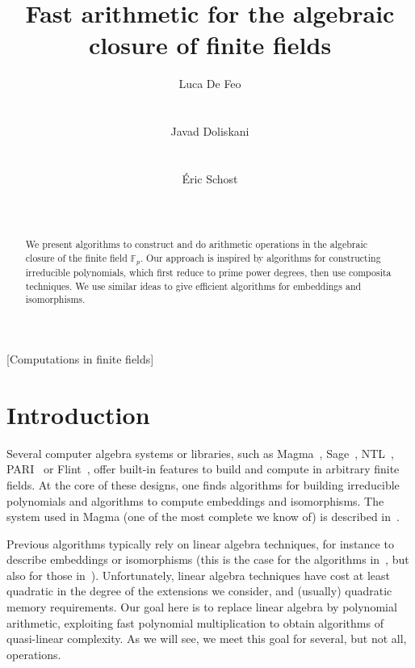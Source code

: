 \documentclass{sig-alternate}
\author{
  \alignauthor Luca De Feo\\
  \affaddr{Laboratoire PRiSM}\\
  \affaddr{Universit\'e de Versailles}\\
  \email{luca.de-feo@uvsq.fr}
  \alignauthor Javad Doliskani\\
  \affaddr{Computer Science Department}\\
  \affaddr{Western University}\\
  \email{jdoliska@uwo.ca}
  \alignauthor \'Eric Schost\\
  \affaddr{Computer Science Department}\\
  \affaddr{Western University}\\
  \email{eschost@uwo.ca}
}
\title{Fast arithmetic for the algebraic closure of finite fields}
\newcounter{algo}
\begin{document}
\maketitle
\begin{abstract}
  We present algorithms to construct and do arithmetic operations in
  the algebraic closure of the finite field $\mathbb{F}_p$. Our
  approach is inspired by algorithms for constructing irreducible
  polynomials, which first reduce to prime power degrees, then use
  composita techniques. We use similar ideas to give efficient
  algorithms for embeddings and isomorphisms.
\end{abstract}

[Computations in finite fields]


\section{Introduction}

Several computer algebra systems or libraries, such as
Magma~\cite{MAGMA}, Sage~\cite{Sage}, NTL~\cite{shoup2003ntl},
PARI~\cite{Pari} or Flint~\cite{hart2010flint}, offer built-in
features to build and compute in arbitrary finite fields. At the core
of these designs, one finds algorithms for building irreducible
polynomials and algorithms to compute embeddings and isomorphisms.
The system used in Magma (one of the most complete we know of) is
described in~\cite{bosma+cannon+steel97}.

Previous algorithms typically rely on linear algebra techniques, for
instance to describe embeddings or isomorphisms (this is the case for
the algorithms in~\cite{bosma+cannon+steel97}, but also for those
in~\cite{LenstraJr91,Allombert02}). Unfortunately, linear algebra
techniques have cost at least quadratic in the degree of the
extensions we consider, and (usually) quadratic memory requirements.
Our goal here is to replace linear algebra by polynomial arithmetic,
exploiting fast polynomial multiplication to obtain algorithms of
quasi-linear complexity. As we will see, we meet this goal for
several, but not all, operations.
\end{document}
